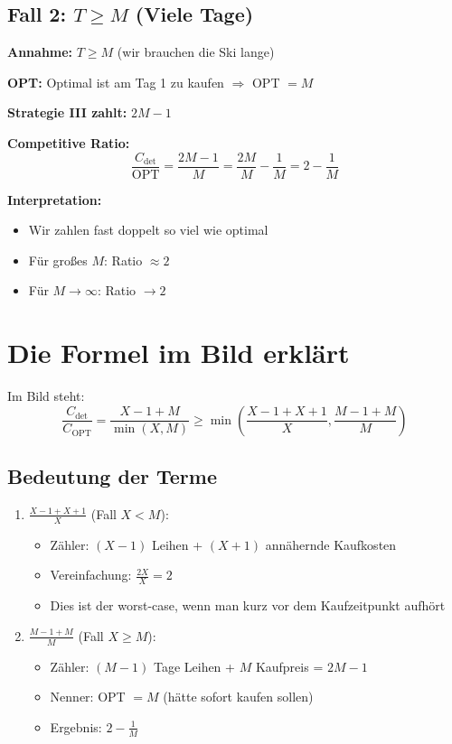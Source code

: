 \documentclass[12pt,a4paper]{article}
\theoremstyle{definition}
\begin{document}
\subsection{Fall 2: $T \geq M$ (Viele Tage)}

\begin{tcolorbox}[colback=green!5!white,colframe=green!75!black]
\textbf{Annahme:} $T \geq M$ (wir brauchen die Ski lange)

\textbf{OPT:} Optimal ist am Tag 1 zu kaufen $\Rightarrow$ OPT $= M$

\textbf{Strategie III zahlt:} $2M - 1$

\textbf{Competitive Ratio:}
\[
\frac{C_{\text{det}}}{\text{OPT}} = \frac{2M-1}{M} = \frac{2M}{M} - \frac{1}{M} = 2 - \frac{1}{M}
\]

\textbf{Interpretation:}
\begin{itemize}
    \item Wir zahlen fast doppelt so viel wie optimal
    \item Für großes $M$: Ratio $\approx 2$
    \item Für $M \to \infty$: Ratio $\to 2$
\end{itemize}
\end{tcolorbox}

\section{Die Formel im Bild erklärt}

Im Bild steht:
\[
\frac{C_{\text{det}}}{C_{\text{OPT}}} = \frac{X-1+M}{\min(X,M)} \geq \min\left(\frac{X-1+X+1}{X}, \frac{M-1+M}{M}\right)
\]

\subsection{Bedeutung der Terme}

\begin{enumerate}
    \item \textbf{$\displaystyle\frac{X-1+X+1}{X}$} (Fall $X < M$):
    \begin{itemize}
        \item Zähler: $(X-1)$ Leihen + $(X+1)$ annähernde Kaufkosten
        \item Vereinfachung: $\displaystyle\frac{2X}{X} = 2$
        \item Dies ist der worst-case, wenn man kurz vor dem Kaufzeitpunkt aufhört
    \end{itemize}
    
    \item \textbf{$\displaystyle\frac{M-1+M}{M}$} (Fall $X \geq M$):
    \begin{itemize}
        \item Zähler: $(M-1)$ Tage Leihen + $M$ Kaufpreis = $2M-1$
        \item Nenner: OPT $= M$ (hätte sofort kaufen sollen)
        \item Ergebnis: $\displaystyle 2 - \frac{1}{M}$
    \end{itemize}
\end{enumerate}
\end{document}
